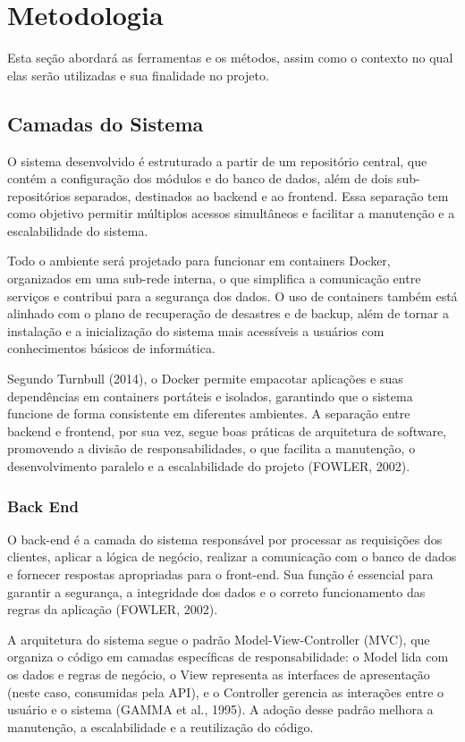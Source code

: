 \documentclass[../main.tex]{subfiles}
\begin{document}
\section{Metodologia}
Esta seção abordará as ferramentas e os métodos, assim como o contexto no qual elas 
serão utilizadas e sua finalidade no projeto.
\subsection{Camadas do Sistema}

O sistema desenvolvido é estruturado a partir de um repositório central, que contém a configuração dos módulos 
e do banco de dados, além de dois sub-repositórios separados, destinados ao backend e ao frontend. Essa 
separação tem como objetivo permitir múltiplos acessos simultâneos e facilitar a manutenção e a escalabilidade 
do sistema.

Todo o ambiente será projetado para funcionar em containers Docker, organizados em uma sub-rede interna, 
o que simplifica a comunicação entre serviços e contribui para a segurança dos dados. O uso de containers 
também está alinhado com o plano de recuperação de desastres e de backup, além de tornar a instalação e a 
inicialização do sistema mais acessíveis a usuários com conhecimentos básicos de informática.

Segundo Turnbull (2014), o Docker permite empacotar aplicações e suas dependências em containers portáteis e 
isolados, garantindo que o sistema funcione de forma consistente em diferentes ambientes. A separação entre 
backend e frontend, por sua vez, segue boas práticas de arquitetura de software, promovendo a divisão de 
responsabilidades, o que facilita a manutenção, o desenvolvimento paralelo e a escalabilidade do projeto (FOWLER, 2002).

\subsubsection{Back End}
O back-end é a camada do sistema responsável por processar as requisições dos clientes, aplicar a lógica de 
negócio, realizar a comunicação com o banco de dados e fornecer respostas apropriadas para o front-end. Sua 
função é essencial para garantir a segurança, a integridade dos dados e o correto funcionamento das regras da 
aplicação (FOWLER, 2002).

A arquitetura do sistema segue o padrão Model-View-Controller (MVC), que organiza o código em camadas específicas 
de responsabilidade: o Model lida com os dados e regras de negócio, o View representa as interfaces de apresentação 
(neste caso, consumidas pela API), e o Controller gerencia as interações entre o usuário e o sistema (GAMMA et al., 1995). 
A adoção desse padrão melhora a manutenção, a escalabilidade e a reutilização do código.
\end{document}

